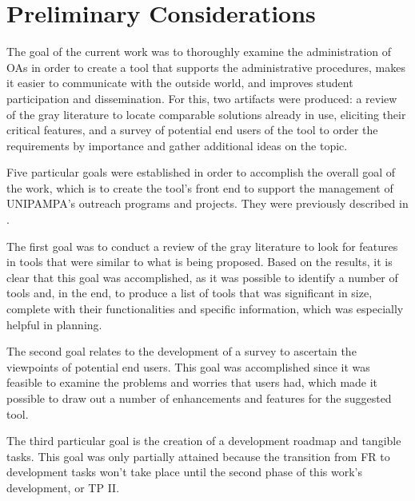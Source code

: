 \chapter{Preliminary Considerations}\label{conclusao}



The goal of the current work was to thoroughly examine the administration of \aclp{OA} in order to create a tool that supports the administrative procedures, makes it easier to communicate with the outside world, and improves student participation and dissemination. For this, two artifacts were produced: a review of the gray literature to locate comparable solutions already in use, eliciting their critical features, and a survey of potential end users of the tool to order the requirements by importance and gather additional ideas on the topic.

Five particular goals were established in order to accomplish the overall goal of the work, which is to create the tool's front end to support the management of \ac{UNIPAMPA}'s outreach programs and projects. They were previously described in .

The first goal was to conduct a review of the gray literature to look for features in tools that were similar to what is being proposed. Based on the results, it is clear that this goal was accomplished, as it was possible to identify a number of tools and, in the end, to produce a list of tools that was significant in size, complete with their functionalities and specific information, which was especially helpful in planning.

The second goal relates to the development of a survey to ascertain the viewpoints of potential end users. This goal was accomplished since it was feasible to examine the problems and worries that users had, which made it possible to draw out a number of enhancements and features for the suggested tool.

The third particular goal is the creation of a development roadmap and tangible tasks. This goal was only partially attained because the transition from \ac{FR} to development tasks won't take place until the second phase of this work's development, or \ac{TP} II.

